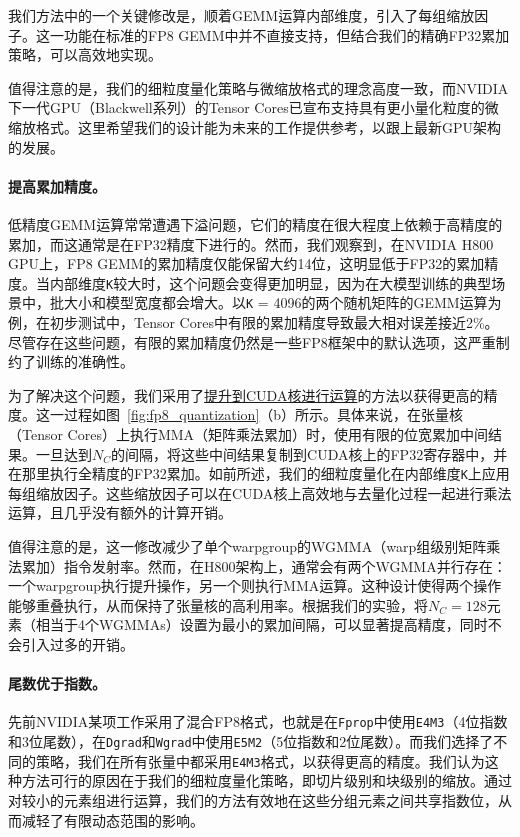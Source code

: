 \documentclass[lang=cn,a4paper,newtx]{elegantpaper}
\begin{document}
我们方法中的一个关键修改是，顺着GEMM运算内部维度，引入了每组缩放因子。这一功能在标准的FP8 GEMM中并不直接支持，但结合我们的精确FP32累加策略，可以高效地实现。

值得注意的是，我们的细粒度量化策略与微缩放格式的理念高度一致，而NVIDIA下一代GPU（Blackwell系列）的Tensor Cores已宣布支持具有更小量化粒度的微缩放格式。这里希望我们的设计能为未来的工作提供参考，以跟上最新GPU架构的发展。

\paragraph{提高累加精度。}
低精度GEMM运算常常遭遇下溢问题，它们的精度在很大程度上依赖于高精度的累加，而这通常是在FP32精度下进行的。然而，我们观察到，在NVIDIA H800 GPU上，FP8 GEMM的累加精度仅能保留大约14位，这明显低于FP32的累加精度。当内部维度\texttt{K}较大时，这个问题会变得更加明显，因为在大模型训练的典型场景中，批大小和模型宽度都会增大。以\texttt{K} = 4096的两个随机矩阵的GEMM运算为例，在初步测试中，Tensor Cores中有限的累加精度导致最大相对误差接近2\%。尽管存在这些问题，有限的累加精度仍然是一些FP8框架中的默认选项，这严重制约了训练的准确性。

为了解决这个问题，我们采用了\underline{提升到CUDA核进行运算}的方法以获得更高的精度。这一过程如图~\ref{fig:fp8_quantization}（b）所示。具体来说，在张量核（Tensor Cores）上执行MMA（矩阵乘法累加）时，使用有限的位宽累加中间结果。一旦达到$N_C$的间隔，将这些中间结果复制到CUDA核上的FP32寄存器中，并在那里执行全精度的FP32累加。如前所述，我们的细粒度量化在内部维度\texttt{K}上应用每组缩放因子。这些缩放因子可以在CUDA核上高效地与去量化过程一起进行乘法运算，且几乎没有额外的计算开销。

值得注意的是，这一修改减少了单个warpgroup的WGMMA（warp组级别矩阵乘法累加）指令发射率。然而，在H800架构上，通常会有两个WGMMA并行存在：一个warpgroup执行提升操作，另一个则执行MMA运算。这种设计使得两个操作能够重叠执行，从而保持了张量核的高利用率。根据我们的实验，将$N_C=128$元素（相当于4个WGMMAs）设置为最小的累加间隔，可以显著提高精度，同时不会引入过多的开销。

\paragraph{尾数优于指数。}
先前NVIDIA某项工作采用了混合FP8格式，也就是在\texttt{Fprop}中使用\texttt{E4M3}（4位指数和3位尾数），在\texttt{Dgrad}和\texttt{Wgrad}中使用\texttt{E5M2}（5位指数和2位尾数）。而我们选择了不同的策略，我们在所有张量中都采用\texttt{E4M3}格式，以获得更高的精度。我们认为这种方法可行的原因在于我们的细粒度量化策略，即切片级别和块级别的缩放。通过对较小的元素组进行运算，我们的方法有效地在这些分组元素之间共享指数位，从而减轻了有限动态范围的影响。
\end{document}

